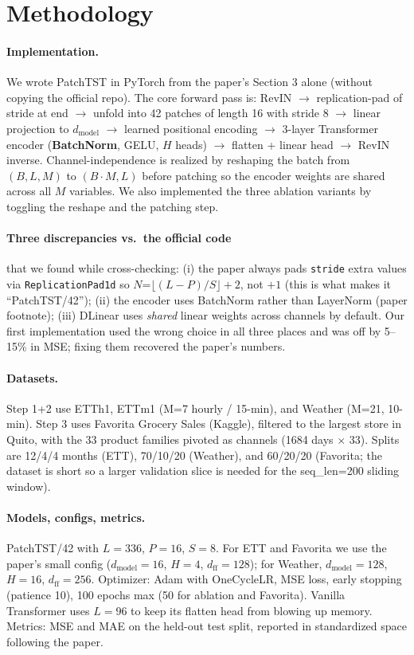 \documentclass[11pt]{article}
\begin{document}
\section{Methodology}

\paragraph{Implementation.} We wrote PatchTST in PyTorch from the paper's Section 3 alone (without copying the official repo). The core forward pass is: RevIN $\rightarrow$ replication-pad of stride at end $\rightarrow$ unfold into 42 patches of length 16 with stride 8 $\rightarrow$ linear projection to $d_{\mathrm{model}}$ $\rightarrow$ learned positional encoding $\rightarrow$ 3-layer Transformer encoder (\textbf{BatchNorm}, GELU, $H$ heads) $\rightarrow$ flatten + linear head $\rightarrow$ RevIN inverse. Channel-independence is realized by reshaping the batch from $(B, L, M)$ to $(B{\cdot}M, L)$ before patching so the encoder weights are shared across all $M$ variables. We also implemented the three ablation variants by toggling the reshape and the patching step.

\paragraph{Three discrepancies vs.\ the official code} that we found while cross-checking: (i) the paper always pads \texttt{stride} extra values via \texttt{ReplicationPad1d} so $N$=$\lfloor (L{-}P)/S\rfloor + 2$, not $+1$ (this is what makes it ``PatchTST/42''); (ii) the encoder uses BatchNorm rather than LayerNorm (paper footnote); (iii) DLinear uses \emph{shared} linear weights across channels by default. Our first implementation used the wrong choice in all three places and was off by 5--15\% in MSE; fixing them recovered the paper's numbers.

\paragraph{Datasets.}
Step 1+2 use ETTh1, ETTm1 (M=7 hourly / 15-min), and Weather (M=21, 10-min). Step 3 uses Favorita Grocery Sales (Kaggle), filtered to the largest store in Quito, with the 33 product families pivoted as channels (1684 days $\times$ 33). Splits are 12/4/4 months (ETT), 70/10/20 (Weather), and 60/20/20 (Favorita; the dataset is short so a larger validation slice is needed for the seq\_len=200 sliding window).

\paragraph{Models, configs, metrics.} PatchTST/42 with $L{=}336$, $P{=}16$, $S{=}8$. For ETT and Favorita we use the paper's small config ($d_{\mathrm{model}}{=}16$, $H{=}4$, $d_{\mathrm{ff}}{=}128$); for Weather, $d_{\mathrm{model}}{=}128$, $H{=}16$, $d_{\mathrm{ff}}{=}256$. Optimizer: Adam with OneCycleLR, MSE loss, early stopping (patience 10), 100 epochs max (50 for ablation and Favorita). Vanilla Transformer uses $L{=}96$ to keep its flatten head from blowing up memory. Metrics: MSE and MAE on the held-out test split, reported in standardized space following the paper.
\end{document}

